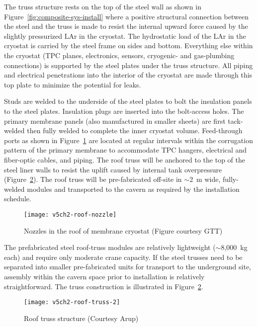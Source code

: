 The truss structure rests on the top of the steel wall as shown in 
Figure~\ref{fig:composite-sys-install} where a positive structural 
connection between the steel and the truss is made to resist 
the internal upward force caused  by the slightly pressurized 
LAr in the cryostat. The hydrostatic load of the LAr in the 
cryostat is carried by the steel frame on sides and bottom. Everything 
else within the cryostat (TPC planes, electronics, sensors,
cryogenic- and gas-plumbing connections) is supported by the 
steel plates under the truss structure. All piping and electrical 
penetrations into the interior of the cryostat are made through 
this top plate to minimize the potential for leaks.

Studs are welded to the underside of the steel plates to bolt the 
insulation panels to the steel plates. Insulation plugs are inserted 
into the bolt-access holes.  The primary membrane panels (also 
manufactured in smaller sheets) are first tack-welded then fully 
welded to complete the inner cryostat volume.  Feed-through ports 
as shown in Figure~\ref{fig:v5ch2-roof-nozzle} are located at regular 
intervals within the corrugation pattern of the primary membrane to 
accommodate TPC hangers, electrical and fiber-optic cables, and piping.
The roof truss will be anchored to the top of the steel liner 
walls to resist the uplift caused by internal tank overpressure
(Figure~\ref{fig:roof-truss}). The roof truss will be pre-fabricated 
off-site in $\sim$2~m wide, fully-welded modules and transported to
the cavern as required by the installation schedule.

\begin{figure}[htbp]
\centering
\texttt{[image: v5ch2-roof-nozzle]} 
\caption[Nozzles in the roof of membrane cryostat]{Nozzles in the roof of membrane cryostat (Figure courtesy GTT)}
\label{fig:v5ch2-roof-nozzle}
\end{figure}


The prefabricated steel roof-truss modules are relatively 
lightweight ($\sim$8,000~kg each) and require only moderate 
crane capacity.  If the steel trusses need to be separated 
into smaller pre-fabricated units for transport to the 
underground site, assembly within the cavern space prior to 
installation is relatively straightforward. The truss 
construction is illustrated in Figure~\ref{fig:roof-truss}.

\begin{figure}[htbp]
\centering
\texttt{[image: v5ch2-roof-truss-2]}
\caption[Roof truss structure]{Roof truss structure  (Courtesy Arup)}
\label{fig:roof-truss}
\end{figure}

